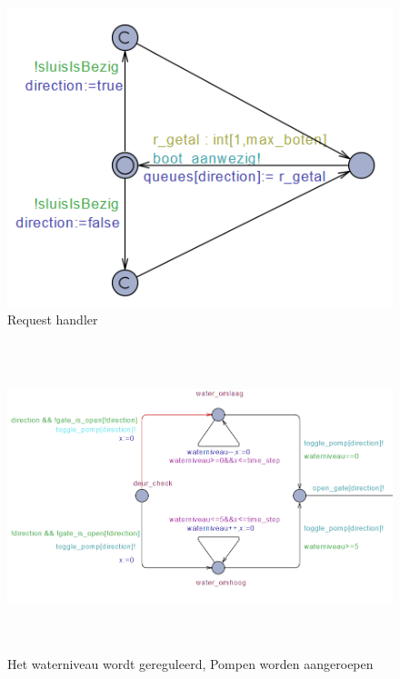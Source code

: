 \documentclass[oneside]{scrbook}
\begin{document}
    \begin{figure}[H]
    \centering
    \includegraphics{Request.PNG}
    \caption{Request handler}
    \label{fig:figure1}
    \end{figure}
  

    \begin{figure}[!h]
    \centering
    \includegraphics[width=16.5cm, height=9cm]{Deur_Check.PNG}
    \caption{Het waterniveau wordt gereguleerd, Pompen worden aangeroepen}
    \label{fig:figure2}
    \end{figure}
\end{document}
